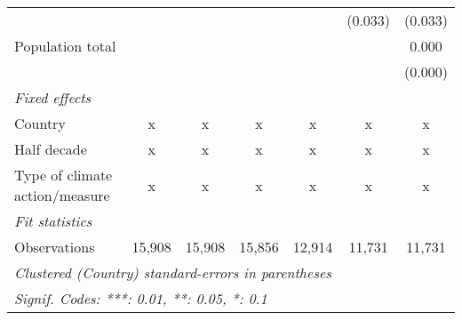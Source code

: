 \begin{tabular}{lcccccc}
                                         &         &         &         &                & (0.033)        & (0.033)\\   
   Population total                      &         &         &         &                &                & 0.000\\   
                                         &         &         &         &                &                & (0.000)\\   
   \emph{Fixed effects}\\
   Country                               & x       & x       & x       & x              & x              & x\\  
   Half decade                           & x       & x       & x       & x              & x              & x\\  
   Type of climate action/measure        & x       & x       & x       & x              & x              & x\\  
   \midrule \emph{Fit statistics}\\
   Observations                          & 15,908  & 15,908  & 15,856  & 12,914         & 11,731         & 11,731\\  
   \midrule
   \multicolumn{7}{l}{\emph{Clustered (Country) standard-errors in parentheses}}\\
   \multicolumn{7}{l}{\emph{Signif. Codes: ***: 0.01, **: 0.05, *: 0.1}}\\
\end{tabular}
\par\endgroup



